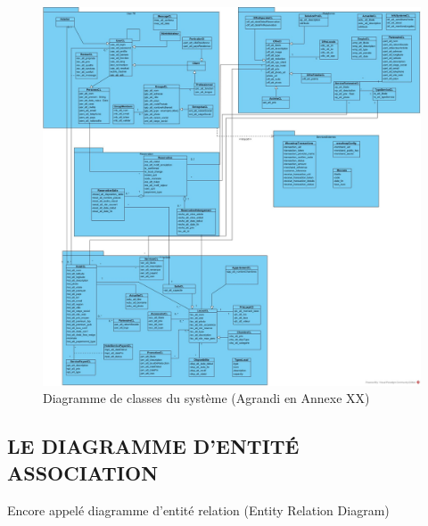 \begin{figure}[!htbp]
	\begin{center}
		\includegraphics[scale=0.30]{images/diag_classe.jpg}
		\caption{Diagramme de classes du système (Agrandi en Annexe XX)}
		\label{classe_diagramme}
	\end{center}
\end{figure}
\cleardoublepage
\subsection{LE DIAGRAMME D'ENTITÉ ASSOCIATION}

Encore appelé diagramme d’entité relation (Entity Relation Diagram)

